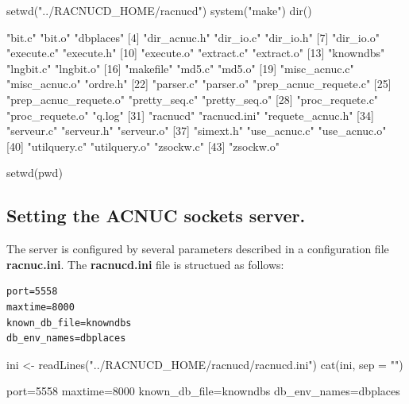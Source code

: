 \documentclass{article}
\begin{document}
\begin{Schunk}
\begin{Sinput}
 setwd("../RACNUCD_HOME/racnucd")
 system("make")
 dir()
\end{Sinput}
\begin{Soutput}
 [1] "bit.c"                "bit.o"                "dbplaces"            
 [4] "dir_acnuc.h"          "dir_io.c"             "dir_io.h"            
 [7] "dir_io.o"             "execute.c"            "execute.h"           
[10] "execute.o"            "extract.c"            "extract.o"           
[13] "knowndbs"             "lngbit.c"             "lngbit.o"            
[16] "makefile"             "md5.c"                "md5.o"               
[19] "misc_acnuc.c"         "misc_acnuc.o"         "ordre.h"             
[22] "parser.c"             "parser.o"             "prep_acnuc_requete.c"
[25] "prep_acnuc_requete.o" "pretty_seq.c"         "pretty_seq.o"        
[28] "proc_requete.c"       "proc_requete.o"       "q.log"               
[31] "racnucd"              "racnucd.ini"          "requete_acnuc.h"     
[34] "serveur.c"            "serveur.h"            "serveur.o"           
[37] "simext.h"             "use_acnuc.c"          "use_acnuc.o"         
[40] "utilquery.c"          "utilquery.o"          "zsockw.c"            
[43] "zsockw.o"            
\end{Soutput}
\begin{Sinput}
 setwd(pwd)
\end{Sinput}
\end{Schunk}

\subsection{Setting the ACNUC sockets server.}
The server is configured by several parameters described in a configuration file \textbf{racnuc.ini}.
The \textbf{racnucd.ini} file is structued as follows:

\begin{verbatim}
port=5558
maxtime=8000
known_db_file=knowndbs
db_env_names=dbplaces
\end{verbatim}

\begin{Schunk}
\begin{Sinput}
 ini <- readLines("../RACNUCD_HOME/racnucd/racnucd.ini")
 cat(ini, sep = "\n")
\end{Sinput}
\begin{Soutput}
port=5558
maxtime=8000
known_db_file=knowndbs
db_env_names=dbplaces
\end{Soutput}
\end{Schunk}
\end{document}
